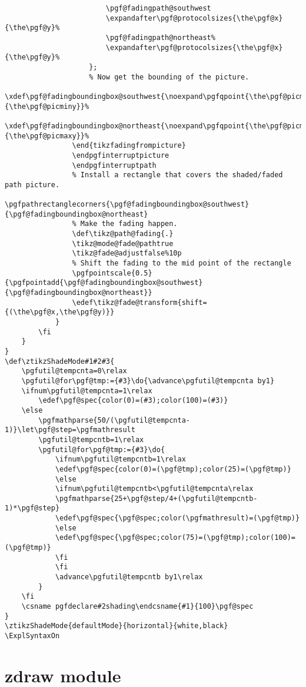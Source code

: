 \begin{verbatim}
                        \pgf@fadingpath@southwest
                        \expandafter\pgf@protocolsizes{\the\pgf@x}{\the\pgf@y}%
                        \pgf@fadingpath@northeast%
                        \expandafter\pgf@protocolsizes{\the\pgf@x}{\the\pgf@y}%
                    };
                    % Now get the bounding of the picture.
                    \xdef\pgf@fadingboundingbox@southwest{\noexpand\pgfqpoint{\the\pgf@picminx}{\the\pgf@picminy}}%
                    \xdef\pgf@fadingboundingbox@northeast{\noexpand\pgfqpoint{\the\pgf@picmaxx}{\the\pgf@picmaxy}}%
                \end{tikzfadingfrompicture}
                \endpgfinterruptpicture
                \endpgfinterruptpath
                % Install a rectangle that covers the shaded/faded path picture.                                
                \pgfpathrectanglecorners{\pgf@fadingboundingbox@southwest}{\pgf@fadingboundingbox@northeast}
                % Make the fading happen.
                \def\tikz@path@fading{.}
                \tikz@mode@fade@pathtrue
                \tikz@fade@adjustfalse%10p
                % Shift the fading to the mid point of the rectangle
                \pgfpointscale{0.5}{\pgfpointadd{\pgf@fadingboundingbox@southwest}{\pgf@fadingboundingbox@northeast}}
                \edef\tikz@fade@transform{shift={(\the\pgf@x,\the\pgf@y)}}
            }
        \fi
    }
}
\def\ztikzShadeMode#1#2#3{
    \pgfutil@tempcnta=0\relax
    \pgfutil@for\pgf@tmp:={#3}\do{\advance\pgfutil@tempcnta by1}
    \ifnum\pgfutil@tempcnta=1\relax
        \edef\pgf@spec{color(0)=(#3);color(100)=(#3)}
    \else
        \pgfmathparse{50/(\pgfutil@tempcnta-1)}\let\pgf@step=\pgfmathresult
        \pgfutil@tempcntb=1\relax
        \pgfutil@for\pgf@tmp:={#3}\do{
            \ifnum\pgfutil@tempcntb=1\relax
            \edef\pgf@spec{color(0)=(\pgf@tmp);color(25)=(\pgf@tmp)}
            \else
            \ifnum\pgfutil@tempcntb<\pgfutil@tempcnta\relax
            \pgfmathparse{25+\pgf@step/4+(\pgfutil@tempcntb-1)*\pgf@step}
            \edef\pgf@spec{\pgf@spec;color(\pgfmathresult)=(\pgf@tmp)}
            \else
            \edef\pgf@spec{\pgf@spec;color(75)=(\pgf@tmp);color(100)=(\pgf@tmp)}
            \fi
            \fi
            \advance\pgfutil@tempcntb by1\relax
        }
    \fi
    \csname pgfdeclare#2shading\endcsname{#1}{100}\pgf@spec
}
\ztikzShadeMode{defaultMode}{horizontal}{white,black}
\ExplSyntaxOn
\end{verbatim}

\section{zdraw module}
\label{code:l3-draw-implement}
